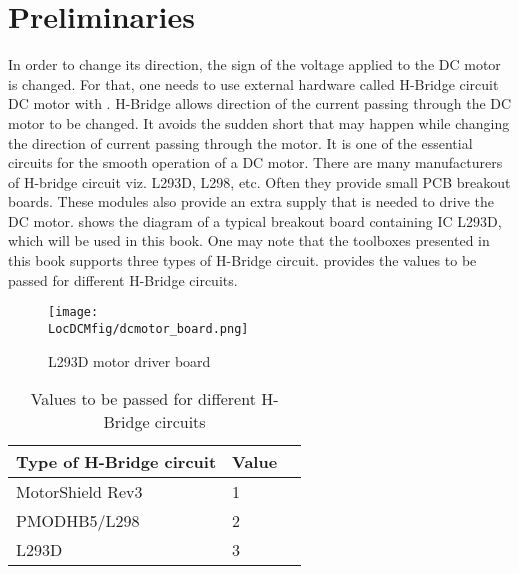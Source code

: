 \section{Preliminaries}
In order to change its direction, the sign of the voltage applied to
the DC motor is changed.  For that, one needs to use external hardware
called %
H-Bridge circuit DC motor with \arduino. %
H-Bridge allows direction of the current passing through the DC motor
to be changed. It avoids the sudden short that may happen while
changing the direction of current passing through the motor.  It is
one of the essential circuits for the smooth operation of a DC
motor. There are many manufacturers of H-bridge circuit viz.
%
L293D, L298, etc.  Often they provide small %
PCB breakout boards.  These modules also provide an extra supply that
is needed to drive the DC motor.   shows
the diagram of a typical breakout board containing IC L293D, which will
be used in this book. One may note that the toolboxes presented in this book supports three types of H-Bridge circuit.  provides the values to be passed for different H-Bridge circuits. \par

\begin{figure}
  \centering
  \texttt{[image: \\LocDCMfig/dcmotor\_board.png]}
  \caption{L293D motor driver board}
  \label{fig:motordriverboard}
\end{figure}

\begin{table}
  \centering
  \caption{Values to be passed for different H-Bridge circuits}
  \label{table:convention}
  \begin{tabular}{llc}\hline
    Type of H-Bridge circuit & Value \\ \hline
    MotorShield Rev3         & 1     \\ \hline 
    PMODHB5/L298             & 2     \\ \hline 
    L293D                    & 3     \\ \hline
  \end{tabular}
\end{table}

